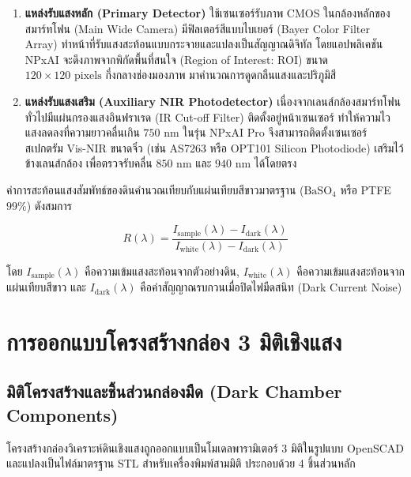 \documentclass[12pt,a4paper,oneside]{book}
\begin{document}
\begin{enumerate}
    \item \textbf{แหล่งรับแสงหลัก (Primary Detector)} ใช้เซนเซอร์รับภาพ CMOS ในกล้องหลักของสมาร์ทโฟน (Main Wide Camera) มีฟิลเตอร์สีแบบไบเยอร์ (Bayer Color Filter Array) ทำหน้าที่รับแสงสะท้อนแบบกระจายและแปลงเป็นสัญญาณดิจิทัล โดยแอปพลิเคชัน NPxAI จะดึงภาพจากพิกัดพื้นที่สนใจ (Region of Interest: ROI) ขนาด $120 \times 120\text{ pixels}$ กึ่งกลางช่องมองภาพ มาคำนวณการดูดกลืนแสงและปริภูมิสี
    
    \item \textbf{แหล่งรับแสงเสริม (Auxiliary NIR Photodetector)} เนื่องจากเลนส์กล้องสมาร์ทโฟนทั่วไปมีแผ่นกรองแสงอินฟราเรด (IR Cut-off Filter) ติดตั้งอยู่หน้าเซนเซอร์ ทำให้ความไวแสงลดลงที่ความยาวคลื่นเกิน $750\text{ nm}$ ในรุ่น NPxAI Pro จึงสามารถติดตั้งเซนเซอร์สเปกตรัม Vis-NIR ขนาดจิ๋ว (เช่น AS7263 หรือ OPT101 Silicon Photodiode) เสริมไว้ข้างเลนส์กล้อง เพื่อตรวจรับคลื่น $850\text{ nm}$ และ $940\text{ nm}$ ได้โดยตรง
\end{enumerate}

ค่าการสะท้อนแสงสัมพัทธ์ของดินคำนวณเทียบกับแผ่นเทียบสีขาวมาตรฐาน ($\text{BaSO}_4$ หรือ PTFE $99\%$) ดังสมการ

\begin{equation}
R(\lambda) = \frac{I_{\text{sample}}(\lambda) - I_{\text{dark}}(\lambda)}{I_{\text{white}}(\lambda) - I_{\text{dark}}(\lambda)}
\end{equation}

โดย $I_{\text{sample}}(\lambda)$ คือความเข้มแสงสะท้อนจากตัวอย่างดิน, $I_{\text{white}}(\lambda)$ คือความเข้มแสงสะท้อนจากแผ่นเทียบสีขาว และ $I_{\text{dark}}(\lambda)$ คือค่าสัญญาณรบกวนเมื่อปิดไฟมืดสนิท (Dark Current Noise)

\chapter{การออกแบบโครงสร้างกล่อง 3 มิติเชิงแสง}

\section{มิติโครงสร้างและชิ้นส่วนกล่องมืด (Dark Chamber Components)}
โครงสร้างกล่องวิเคราะห์ดินเชิงแสงถูกออกแบบเป็นโมเดลพารามิเตอร์ 3 มิติในรูปแบบ OpenSCAD และแปลงเป็นไฟล์มาตรฐาน STL สำหรับเครื่องพิมพ์สามมิติ ประกอบด้วย 4 ชิ้นส่วนหลัก
\end{document}
